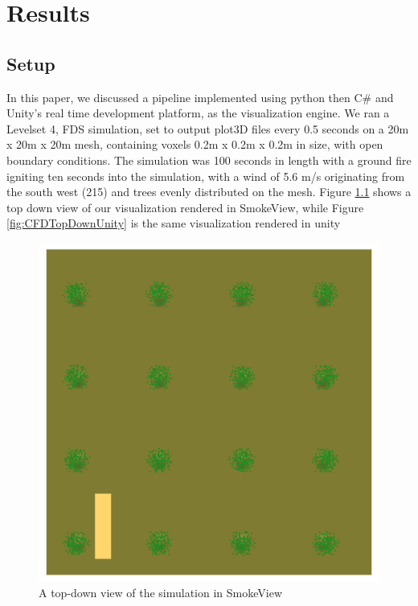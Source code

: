 
\chapter{Results} %

\label{Chapter3} %

\section{Setup}
In this paper, we discussed a pipeline implemented using python then C\# and Unity’s real time development platform, as the visualization engine. We ran a Levelset 4, FDS simulation, set to output plot3D files every 0.5 seconds on a 20m x 20m x 20m mesh, containing voxels 0.2m x 0.2m x 0.2m in size, with open boundary conditions. The simulation was 100 seconds in length with a ground fire igniting ten seconds into the simulation, with a wind of 5.6 m/s originating from the south west (215\textdegree) and trees evenly distributed on the mesh.  Figure \ref{fig:CFDTopDownSmokeview} shows a top down view of our visualization rendered in SmokeView, while Figure  \ref{fig:CFDTopDownUnity} is the same visualization rendered in unity \par
[Github link to fds file?]\par
\begin{figure}
\centering
\includegraphics[scale=.3]{Figures/TopDownSMV.png}
\decoRule
\caption[Top Down SmokeView View]{A top-down view of the simulation in SmokeView}
\label{fig:CFDTopDownSmokeview}
\end{figure}
